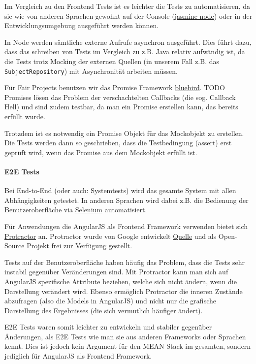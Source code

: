 \documentclass[]{article}
\begin{document}
Im Vergleich zu den Frontend Tests ist es leichter die Tests zu
automatisieren, da sie wie von anderen Sprachen gewohnt auf der Console
(\href{https://github.com/mhevery/jasmine-node}{jasmine-node}) oder in
der Entwicklungsumgebung ausgeführt werden können.

In Node werden sämtliche externe Aufrufe asynchron ausgeführt. Dies
führt dazu, dass das schreiben von Tests im Vergleich zu z.B. Java
relativ aufwändig ist, da die Tests trotz Mocking der externen Quellen
(in unserem Fall z.B. das \texttt{SubjectRepository}) mit Asynchronität
arbeiten müssen.

Für Fair Projects benutzen wir das Promise Framework
\href{http://bluebirdjs.com/}{bluebird}. TODO Promises lösen das Problem
der verschachtelten Callbacks (die sog. Callback Hell) und sind zudem
testbar, da man ein Promise erstellen kann, das bereits erfüllt wurde.

Trotzdem ist es notwendig ein Promise Objekt für das Mockobjekt zu
erstellen. Die Tests werden dann so geschrieben, dass die Testbedingung
(assert) erst geprüft wird, wenn das Promise aus dem Mockobjekt erfüllt
ist.

\paragraph{E2E Tests}\label{e2e-tests}

Bei End-to-End (oder auch: Systemtests) wird das gesamte System mit
allen Abhängigkeiten getestet. In anderen Sprachen wird dabei z.B. die
Bedienung der Benutzeroberfläche via
\href{http://www.seleniumhq.org/}{Selenium} automatisiert.

Für Anwendungen die AngularJS als Frontend Framework verwenden bietet
sich \href{http://www.protractortest.org/}{Protractor} an. Protractor
wurde von Google entwickelt
\href{http://googletesting.blogspot.de/2014/11/protractor-angular-testing-made-easy.html}{Quelle}
und als Open-Source Projekt frei zur Verfügung gestellt.

Tests auf der Benutzeroberfläche haben häufig das Problem, dass die
Tests sehr instabil gegenüber Veränderungen sind. Mit Protractor kann
man sich auf AngularJS spezifische Attribute beziehen, welche sich nicht
ändern, wenn die Darstellung verändert wird. Ebenso ermöglich Protractor
die inneren Zustände abzufragen (also die Models in AngularJS) und nicht
nur die grafische Darstellung des Ergebnisses (die sich vermutlich
häufiger ändert).

E2E Tests waren somit leichter zu entwickeln und stabiler gegenüber
Änderungen, als E2E Tests wie man sie aus anderen Frameworks oder
Sprachen kennt. Dies ist jedoch kein Argument für den MEAN Stack im
gesamten, sondern jediglich für AngularJS als Frontend Framework.
\end{document}
